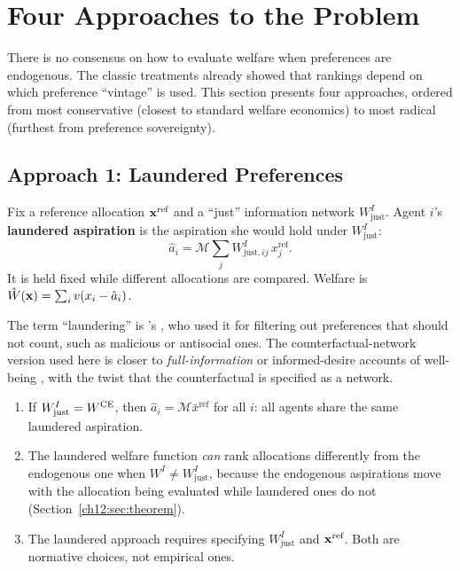 \documentclass[../structural_economics_book.tex]{subfiles}
\begin{document}
\section{Four Approaches to the Problem}
\label{ch12:sec:approaches}

There is no consensus on how to evaluate welfare when preferences are endogenous. The classic treatments \citep{weizsacker1971notes,hammond1976endogenous,pollak1978endogenous} already showed that rankings depend on which preference ``vintage'' is used. This section presents four approaches, ordered from most conservative (closest to standard welfare economics) to most radical (furthest from preference sovereignty).


\subsection{Approach 1: Laundered Preferences}

\begin{definition}\label{ch12:def:laundered}
Fix a reference allocation $\mathbf{x}^{\text{ref}}$ and a ``just'' information network $W^I_{\text{just}}$. Agent $i$'s \textbf{laundered aspiration} is the aspiration she would hold under $W^I_{\text{just}}$:
\begin{equation}\label{ch12:eq:laundered}
\hat{a}_i = \mathcal{M}\sum_j W^I_{\text{just},ij}\,x^{\text{ref}}_j.
\end{equation}
It is held fixed while different allocations are compared. Welfare is $\hat{W}(\mathbf{x}) = \sum_i v(x_i - \hat{a}_i)$.
\end{definition}

The term ``laundering'' is \citeauthor{goodin1986laundering}'s \citeyearpar{goodin1986laundering}, who used it for filtering out preferences that should not count, such as malicious or antisocial ones. The counterfactual-network version used here is closer to \textit{full-information} or informed-desire accounts of well-being \citep{brandt1979theory,harsanyi1977morality}, with the twist that the counterfactual is specified as a network.

\begin{proposition}\label{ch12:prop:laundered}
\begin{enumerate}
\item If $W^I_{\text{just}} = W^{\text{CE}}$, then $\hat{a}_i = \mathcal{M}\bar{x}^{\text{ref}}$ for all $i$: all agents share the same laundered aspiration.
\item The laundered welfare function \textit{can} rank allocations differently from the endogenous one when $W^I \neq W^I_{\text{just}}$, because the endogenous aspirations move with the allocation being evaluated while laundered ones do not (Section~\ref{ch12:sec:theorem}).
\item The laundered approach requires specifying $W^I_{\text{just}}$ and $\mathbf{x}^{\text{ref}}$. Both are normative choices, not empirical ones.
\end{enumerate}
\end{proposition}
\end{document}

